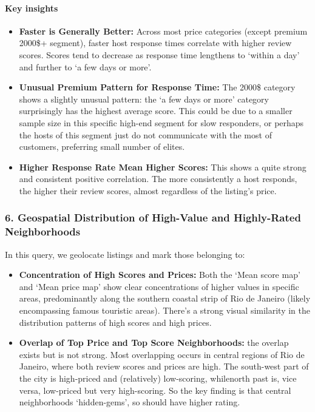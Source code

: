 \paragraph{Key insights}
\begin{itemize}
    \item \textbf{Faster is Generally Better:} Across most price categories (except premium 2000\$+ segment), faster host response times correlate with higher review scores. Scores tend to decrease as response time lengthens to `within a day' and further to `a few days or more'.
    \item \textbf{Unusual Premium Pattern for Response Time:} The 2000\$ category shows a slightly unusual pattern: the `a few days or more' category surprisingly has the highest average score. This could be due to a smaller sample size in this specific high-end segment for slow responders, or perhaps the hosts of this segment just do not communicate with the most of customers, preferring small number of elites.
    \item \textbf{Higher Response Rate Mean Higher Scores:} This shows a quite strong and consistent positive correlation. The more consistently a host responds, the higher their review scores, almost regardless of the listing's price.
\end{itemize}

\subsubsection*{6. Geospatial Distribution of High-Value and Highly-Rated Neighborhoods}

In this query, we geolocate listings and mark those belonging to:
\begin{itemize}
    \item \textbf{Concentration of High Scores and Prices:} Both the `Mean score map' and `Mean price map' show clear concentrations of higher values in specific areas, predominantly along the southern coastal strip of Rio de Janeiro (likely encompassing famous touristic areas). There's a strong visual similarity in the distribution patterns of high scores and high prices.
    \item \textbf{Overlap of Top Price and Top Score Neighborhoods:} the overlap exists but is not strong. Most overlapping occurs in central regions of Rio de Janeiro, where both review scores and prices are high. The south-west part of the city is high-priced and (relatively) low-scoring, whilenorth past is, vice versa, low-priced but very high-scoring. So the key finding is that central neighborhoods `hidden-gems', so should have higher rating.
\end{itemize}

